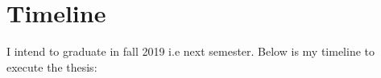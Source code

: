 \chapter{Timeline}
I intend to graduate in fall 2019 i.e next semester. Below is my timeline to execute the thesis: